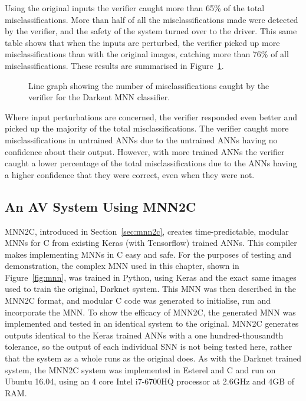 Using the original inputs the verifier caught more than 65\% of the total misclassifications.
More than half of all the misclassifications made were detected by the verifier, and the safety of the system turned over to the driver.
This same table shows that when the inputs are perturbed, the verifier picked up more misclassifications than with the original images, catching more than 76\% of all misclassifications.
These results are summarised in Figure~\ref{fig:sign-graphboth}.

\begin{figure}[H]
	\centering
	\scalebox{0.9}{}
	\caption{Line graph showing the number of misclassifications caught by the verifier for the Darkent \ac{MNN} classifier. \label{fig:sign-graphboth}}
\end{figure}

Where input perturbations are concerned, the verifier responded even better and picked up the majority of the total misclassifications.
The verifier caught more misclassifications in untrained \acp{ANN} due to the untrained \acp{ANN} having no confidence about their output.
However, with more trained \acp{ANN} the verifier caught a lower percentage of the total misclassifications due to the \acp{ANN} having a higher confidence that they were correct, even when they were not.

\subsection{An \ac{AV} System Using \acf{MNN2C}}
\ac{MNN2C}, introduced in Section~\ref{sec:mnn2c}, creates time-predictable, modular \acfp{MNN} for C from existing Keras (with Tensorflow) trained \acp{ANN}. 
This compiler makes implementing \acfp{MNN} in C easy and safe.
For the purposes of testing and demonstration, the complex \ac{MNN} used in this chapter, shown in Figure~\ref{fig:mnn}, was trained in Python, using Keras and the exact same images used to train the original, Darknet system.
This \ac{MNN} was then described in the \ac{MNN2C} format, and modular C code was generated to initialise, run and incorporate the \ac{MNN}.
To show the efficacy of \ac{MNN2C}, the generated \ac{MNN} was implemented and tested in an identical system to the original. 
\ac{MNN2C} generates outputs identical to the Keras trained \acp{ANN} with a one hundred-thousandth tolerance, so the output of each individual \ac{SNN} is not being tested here, rather that the system as a whole runs as the original does.
As with the Darknet trained system, the \ac{MNN2C} system was implemented in Esterel and C and run on Ubuntu 16.04, using an 4 core Intel i7-6700HQ processor at 2.6GHz and 4GB of RAM.

